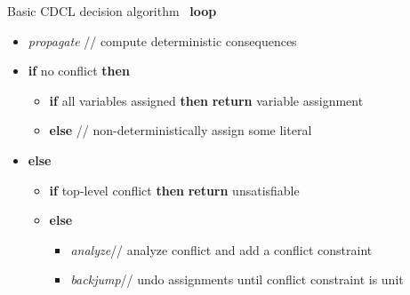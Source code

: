 \documentclass[t]{beamer}
\renewcommand{\Tsigned}[1]{\ensuremath{{#1}\mapsto\true}} %
\renewcommand{\Fsigned}[1]{\ensuremath{{#1}\mapsto\false}} %
\begin{document}
\begin{frame}[c]{Basic CDCL decision algorithm}
  \ \textbf{loop}
    \begin{itemize}
    \item [] \textit{propagate}  
      \hfill// compute deterministic consequences
    \item [] \textbf{if} no conflict \textbf{then}
      \begin{itemize}
      \item [] \textbf{if} all variables assigned 
        \textbf{then} 
        \textbf{return} variable assignment
      \item [] \textbf{else}
        \alert<2>{ }
        \hfill// \alert<2>{non-deterministically assign some literal}
      \end{itemize}
    \item [] \textbf{else} 
      \begin{itemize}
      \item [] \textbf{if} top-level conflict %
        \textbf{then} 
        \textbf{return} unsatisfiable
      \item [] \textbf{else}
        \begin{itemize}
        \item [] \textit{analyze}\hfill// analyze conflict and add a conflict constraint
        \item [] \textit{backjump}\hfill// undo assignments until conflict constraint is unit
        \end{itemize}
      \end{itemize}
    \end{itemize}
\end{frame}
\end{document}
